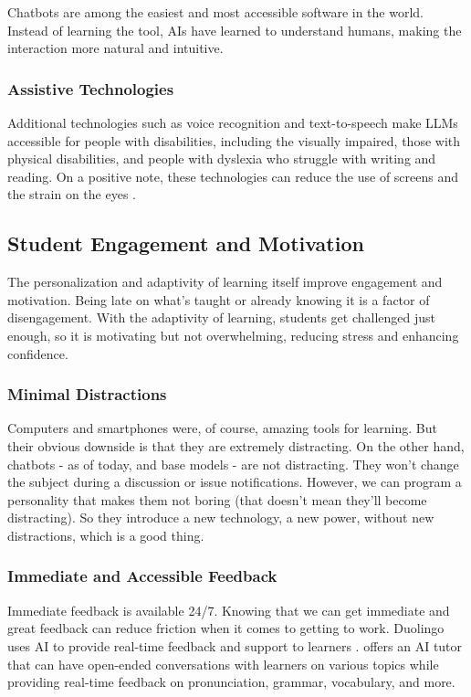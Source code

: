 \documentclass{article}
\begin{document}
Chatbots are among the easiest and most accessible software
in the world. Instead of learning the tool,
AIs have learned to understand humans, making the interaction
more natural and intuitive.

\subsubsection{Assistive Technologies}

Additional technologies such as voice recognition and
text-to-speech make LLMs accessible for people with disabilities,
including the visually impaired, those with physical disabilities,
and people with dyslexia who struggle with writing and reading.
On a positive note, these technologies can reduce the use of screens
and the strain on the eyes \cite{ted_audio_computers}.

\subsection{Student Engagement and Motivation}

The personalization and adaptivity of learning itself
improve engagement and motivation. Being late on what's
taught or already knowing it is a factor of disengagement.
With the adaptivity of learning, students get challenged just enough,
so it is motivating but not overwhelming, reducing stress and enhancing confidence.

\subsubsection{Minimal Distractions}

Computers and smartphones were, of course, amazing tools for learning.
But their obvious downside is that they are extremely distracting.
On the other hand, chatbots - as of today, and base models - are not distracting.
They won't change the subject during a discussion or issue notifications.
However, we can program a personality that makes them not boring
(that doesn't mean they'll become distracting). So they introduce a new technology, a new power, without new distractions, which is a good thing.

\subsubsection{Immediate and Accessible Feedback}

Immediate feedback is available 24/7.
Knowing that we can get immediate and great feedback
can reduce friction when it comes to getting to work.
Duolingo uses AI to provide real-time feedback and support
to learners \cite{forbes_duolingo_ai}. \cite[Speak]{speak} offers an AI
tutor that can have open-ended conversations with
learners on various topics while providing real-time
feedback on pronunciation, grammar, vocabulary,
and more.
\end{document}
